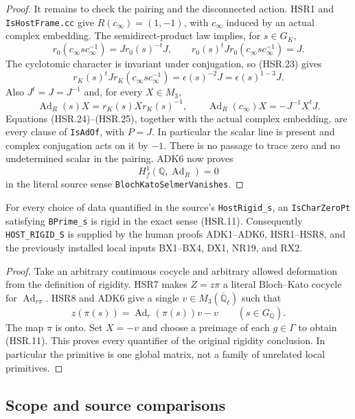 \begin{proof}
It remains to check the pairing and the disconnected action.
HSR1 and \texttt{IsHostFrame.cc} give
$R(c_\infty)=(1,-1)$, with $c_\infty$ induced by an actual
complex embedding.  The semidirect-product law implies, for
$s\in G_K$,
\[
 r_0(c_\infty s c_\infty^{-1})
      =Jr_0(s)^{-t}J,\qquad
 r_0(s)^tJr_0(c_\infty s c_\infty^{-1})=J.
\]
The cyclotomic character is invariant under conjugation, so
(HSR.23) gives
\[
 r_K(s)^tJr_K(c_\infty s c_\infty^{-1})
                       =\epsilon(s)^{-2}J
                       =\epsilon(s)^{1-3}J.
 \tag{HSR.24}
\]
Also $J^t=J=J^{-1}$ and, for every $X\in M_3$,
\[
 \operatorname{Ad}_R(s)X=r_K(s)Xr_K(s)^{-1},\qquad
 \operatorname{Ad}_R(c_\infty)X=-J^{-1}X^tJ.
 \tag{HSR.25}
\]
Equations (HSR.24)--(HSR.25), together with the actual complex
embedding, are every clause of \texttt{IsAdOf}, with $P=J$.
In particular the scalar line is present and complex conjugation
acts on it by $-1$.  There is no passage to trace zero and no
undetermined scalar in the pairing.  ADK6 now proves
\[
 H^1_f(\mathbb Q,\operatorname{Ad}_R)=0
\]
in the literal source sense \texttt{BlochKatoSelmerVanishes}.
\end{proof}

\begin{theorem}
\label{claim:HSR9}
For every choice of data quantified in the source's
\texttt{HostRigid\_s}, an \texttt{IsCharZeroPt} satisfying
\texttt{BPrime\_s} is rigid in the exact sense (HSR.11).
Consequently \texttt{HOST\_RIGID\_S} is supplied by the
human proofs ADK1--ADK6, HSR1--HSR8, and the previously installed
local inputs BX1--BX4, DX1, NR19, and RX2.
\end{theorem}
\begin{proof}
Take an arbitrary continuous cocycle and arbitrary allowed
deformation from the definition of rigidity.  HSR7 makes
$Z=z\pi$ a literal Bloch--Kato cocycle for
$\operatorname{Ad}_{r\pi}$.  HSR8 and ADK6 give a single
$v\in M_3(\overline{\mathbb Q}_\ell)$ such that
\[
 z(\pi(s))=\operatorname{Ad}_r(\pi(s))v-v
                       \qquad(s\in G_{\mathbb Q}).
\]
The map $\pi$ is onto.  Set $X=-v$ and choose a preimage of
each $g\in\Gamma$ to obtain (HSR.11).  This proves every
quantifier of the original rigidity conclusion.  In particular
the primitive is one global matrix, not a family of unrelated
local primitives.
\end{proof}

\subsection{Scope and source comparisons}

